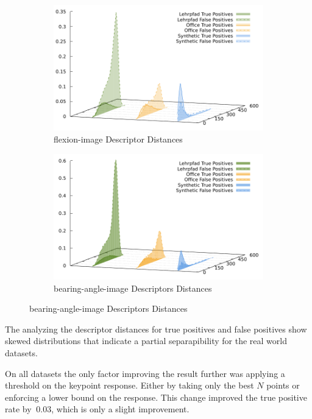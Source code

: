 \begin{figure}[H]
\begin{subfigure}[t]{0.45\linewidth}
    \includegraphics[width=\linewidth]{chapter06/results/SIFT/flexion/descriptor_distances.pdf}%
    \caption{\gls{flexion-image} Descriptor Distances}
\end{subfigure}\quad
\begin{subfigure}[t]{0.45\linewidth}
    \includegraphics[width=\linewidth]{chapter06/results/SIFT/bearing/descriptor_distances.pdf}%
    \caption{\gls{bearing-angle-image} Descriptors Distances}
\end{subfigure}
\end{figure}
The analyzing the descriptor distances for true positives and false positives show skewed distributions that indicate a partial separapibility for the real world datasets.

On all datasets the only factor improving the result further was applying a threshold on the keypoint response.
Either by taking only the best $N$ points or enforcing a lower bound on the response.
This change improved the true positive rate by $~0.03$, which is only a slight improvement.

